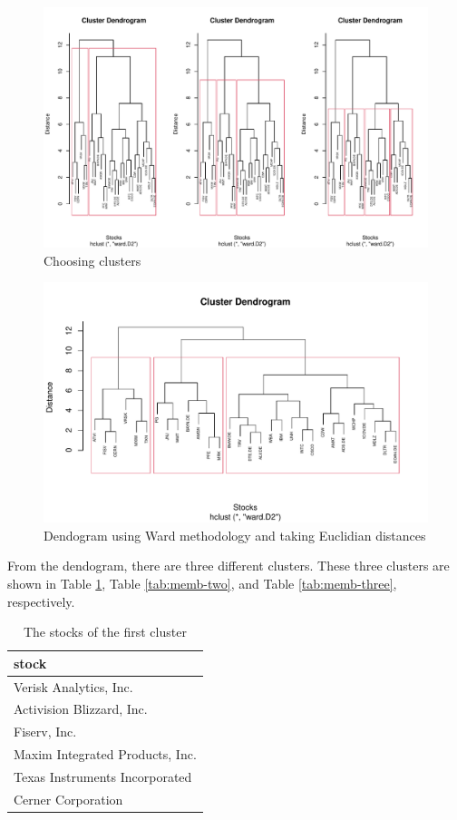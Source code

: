 \documentclass[11pt,a4paper,]{article}
\begin{document}
\begin{figure}
\centering
\includegraphics{ass2_files/figure-latex/ward-1.pdf}
\caption{\label{fig:ward}Choosing clusters}
\end{figure}

\begin{figure}
\centering
\includegraphics{ass2_files/figure-latex/ward-3-1.pdf}
\caption{\label{fig:ward-3}Dendogram using Ward methodology and taking Euclidian distances}
\end{figure}

From the dendogram, there are three different clusters. These three clusters are shown in Table \ref{tab:memb-w}, Table \ref{tab:memb-two}, and Table \ref{tab:memb-three}, respectively.

\begin{table}

\caption{\label{tab:memb-w}The stocks of the first cluster}
\centering
\begin{tabular}[t]{l}
\hline
stock\\
\hline
Verisk Analytics, Inc.\\
\hline
Activision Blizzard, Inc.\\
\hline
Fiserv, Inc.\\
\hline
Maxim Integrated Products, Inc.\\
\hline
Texas Instruments Incorporated\\
\hline
Cerner Corporation\\
\hline
\end{tabular}
\end{table}
\end{document}
